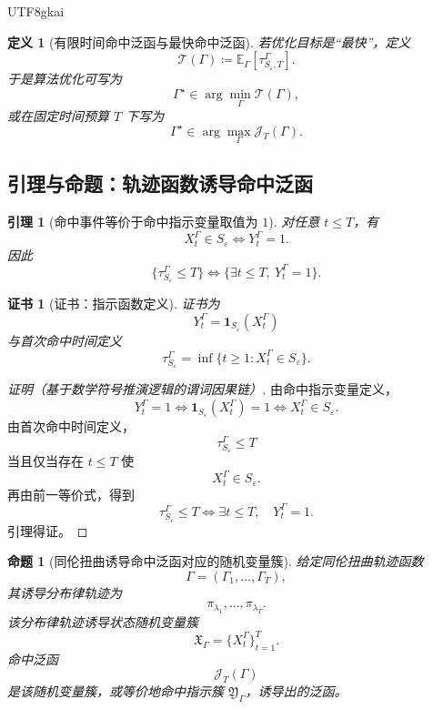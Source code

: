 \documentclass[12pt]{article}
\newtheorem{definition}{定义}[section]
\newtheorem{proposition}{命题}[section]
\newtheorem{lemma}{引理}[section]
\newtheorem{Certificate}{证书}[section]
\newcommand{\DefEq}{\coloneqq}
\begin{document}
\begin{CJK*}{UTF8}{gkai}
\begin{definition}[有限时间命中泛函与最快命中泛函]
若优化目标是“最快”，定义
\[
  \mathcal T(\Gamma)
  \DefEq
  \mathbb E_\Gamma[\tau_{S_\varepsilon,T}^\Gamma].
\]
于是算法优化可写为
\[
  \Gamma^\star
  \in
  \arg\min_{\Gamma}\mathcal T(\Gamma),
\]
或在固定时间预算 \(T\) 下写为
\[
  \Gamma^\star
  \in
  \arg\max_{\Gamma}\mathcal J_T(\Gamma).
\]
\end{definition}

\subsection{引理与命题：轨迹函数诱导命中泛函}
\label{subsec:tex55-homtwist-propositions}

\begin{lemma}[命中事件等价于命中指示变量取值为 \(1\)]
\label{lem:tex55-homtwist-hit-equivalence}
对任意 \(t\le T\)，有
\[
  X_t^\Gamma\in S_\varepsilon
  \Longleftrightarrow
  Y_t^\Gamma=1.
\]
因此
\[
  \{\tau_{S_\varepsilon}^\Gamma\le T\}
  \Longleftrightarrow
  \{\exists t\le T,\ Y_t^\Gamma=1\}.
\]
\end{lemma}

\begin{Certificate}[证书：指示函数定义]
\label{cert:tex55-homtwist-hit-equivalence}
证书为
\[
  Y_t^\Gamma=\mathbf 1_{S_\varepsilon}(X_t^\Gamma)
\]
与首次命中时间定义
\[
  \tau_{S_\varepsilon}^\Gamma
  =
  \inf\{t\ge1:X_t^\Gamma\in S_\varepsilon\}.
\]
\end{Certificate}

\begin{proof}[证明（基于数学符号推演逻辑的谓词因果链）]
由命中指示变量定义，
\[
  Y_t^\Gamma=1
  \Longleftrightarrow
  \mathbf 1_{S_\varepsilon}(X_t^\Gamma)=1
  \Longleftrightarrow
  X_t^\Gamma\in S_\varepsilon.
\]
由首次命中时间定义，
\[
  \tau_{S_\varepsilon}^\Gamma\le T
\]
当且仅当存在 \(t\le T\) 使
\[
  X_t^\Gamma\in S_\varepsilon.
\]
再由前一等价式，得到
\[
  \tau_{S_\varepsilon}^\Gamma\le T
  \Longleftrightarrow
  \exists t\le T,\quad Y_t^\Gamma=1.
\]
引理得证。
\end{proof}

\begin{proposition}[同伦扭曲诱导命中泛函对应的随机变量簇]
\label{prop:tex55-homtwist-induces-functional}
给定同伦扭曲轨迹函数
\[
  \Gamma=(\Gamma_1,\ldots,\Gamma_T),
\]
其诱导分布律轨迹为
\[
  \pi_{\lambda_1},\ldots,\pi_{\lambda_T}.
\]
该分布律轨迹诱导状态随机变量簇
\[
  \mathfrak X_\Gamma=\{X_t^\Gamma\}_{t=1}^{T}.
\]
命中泛函
\[
  \mathcal J_T(\Gamma)
\]
是该随机变量簇，或等价地命中指示簇 \(\mathfrak Y_\Gamma\)，诱导出的泛函。
\end{proposition}


\end{CJK*}
\end{document}
